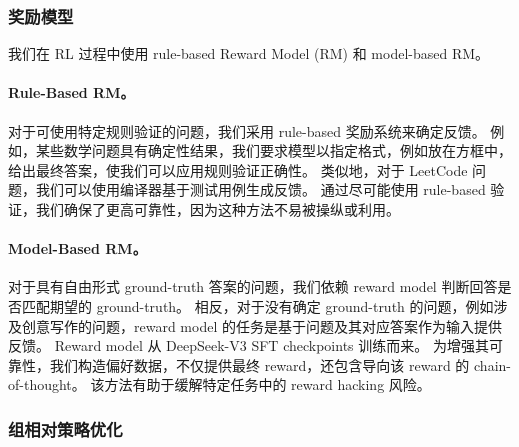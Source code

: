 \documentclass[11pt, a4paper, logo, copyright, nonumbering]{deepseek}
\newcommand{\dsviii}{DeepSeek-V3}
\begin{document}
\subsubsection{奖励模型}

我们在 RL 过程中使用 rule-based Reward Model (RM) 和 model-based RM。

\paragraph{Rule-Based RM。}
对于可使用特定规则验证的问题，我们采用 rule-based 奖励系统来确定反馈。
例如，某些数学问题具有确定性结果，我们要求模型以指定格式，例如放在方框中，给出最终答案，使我们可以应用规则验证正确性。
类似地，对于 LeetCode 问题，我们可以使用编译器基于测试用例生成反馈。
通过尽可能使用 rule-based 验证，我们确保了更高可靠性，因为这种方法不易被操纵或利用。

\paragraph{Model-Based RM。}
对于具有自由形式 ground-truth 答案的问题，我们依赖 reward model 判断回答是否匹配期望的 ground-truth。
相反，对于没有确定 ground-truth 的问题，例如涉及创意写作的问题，reward model 的任务是基于问题及其对应答案作为输入提供反馈。
Reward model 从 \dsviii{} SFT checkpoints 训练而来。
为增强其可靠性，我们构造偏好数据，不仅提供最终 reward，还包含导向该 reward 的 chain-of-thought。
该方法有助于缓解特定任务中的 reward hacking 风险。

\subsubsection{组相对策略优化}
\end{document}
